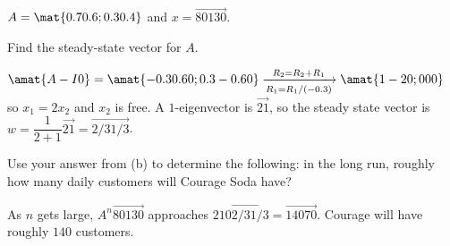 \begin{problems}
\begin{subproblems}
	$A= \mat{0.7 0.6; 0.3 0.4}$ and $x=\vec{80 130}$.
	\newline
	
	\else
	\fi
	
	\subproblem Find the steady-state vector for $A$.
	\ifanswers
	\newline
	
	$\amat{A-I 0}= \amat{-0.3 0.6 0; 0.3 -0.6 0}
    \xrightarrow[R_1=R_1/(-0.3)]{R_2=R_2+R_1} \amat{1 -2 0; 0 0 0}$
    \newline so $x_1 = 2x_2$ and $x_2$ is free.  A $1$-eigenvector is
    $\vec{2 1}$, so the steady state vector is
    $w= \dfrac{1}{2+1} \vec{2 1} = \vec{2/3 1/3}$.  \newline
	
	\else
	\fi
	
	\subproblem Use your answer from (b) to determine the following:
    in the long run, roughly how many daily customers will Courage
    Soda have?
    \ifanswers

      As $n$ gets large, $A^n \vec{80 130}$
      approaches $210 \vec{2/3 1/3} = \vec{140 70}$.  Courage will
      have roughly $140$ customers.  \else \vspace{3cm} \fi
	
	\end{subproblems}

\end{problems}\setcounter{problem}{0}


\newpage